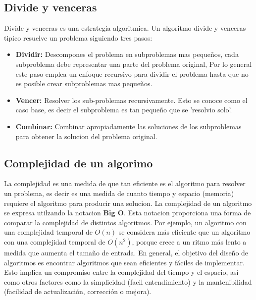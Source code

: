 \documentclass[9pt,letterpaper,onecolumn]{rho-class/rho}
\begin{document}
    \subsection{Divide y venceras}
    Divide y venceras es una estrategia algoritmica. Un algoritmo divide y venceras tipico resuelve un problema siguiendo tres pasos:
        \begin{itemize}
            \item \textbf{Dividir:} Descompones el problema en subproblemas mas pequeños, cada subproblema debe representar una parte del problema
            original, Por lo general este paso emplea un enfoque recursivo para dividir el problema hasta que no es posible crear subproblemas mas pequeños.
            \item \textbf{Vencer:} Resolver los sub-problemas recursivamente. Esto se conoce como el caso base, es decir el subproblema es tan pequeño 
            que se 'resolvio solo'.
            \item \textbf{Combinar:} Combinar apropiadamente las soluciones de los subproblemas para obtener la solucion del problema original.
        \end{itemize}

    \subsection{Complejidad de un algorimo}
    La complejidad es una medida de que tan eficiente es el algoritmo para resolver un problema, es decir es una medida de cuanto tiempo y espacio
    (memoria) requiere el algoritmo para producir una solucion.
    La complejidad de un algoritmo se expresa utilzando la notacion \textbf{Big O}. Esta notacion proporciona una forma de comparar la complejidad
    de distintos algoritmos. Por ejemplo, un algoritmo con una complejidad temporal de $O(n)$ se considera más eficiente que un algoritmo con 
    una complejidad temporal de $O(n^2)$, porque crece a un ritmo más lento a medida que aumenta el tamaño de entrada.
    En general, el objetivo del diseño de algoritmos es encontrar algoritmos que sean eficientes y fáciles de implementar. 
    Esto implica un compromiso entre la complejidad del tiempo y el espacio, así como otros factores como la simplicidad (facil entendimiento) 
    y la mantenibilidad (facilidad de actualización, corrección o mejora).
\end{document}
